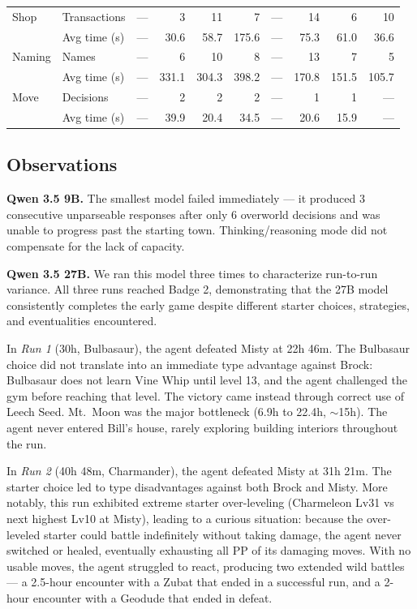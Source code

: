 \documentclass{article}
\begin{document}
\begin{table}[h]
{\begin{tabular}{llrrrrrrrr}
Shop           & Transactions   & --- &    3 &   11 &    7 & --- &   14 &    6 &   10 \\
               & Avg time (s)   & --- & 30.6 & 58.7 & 175.6 & --- & 75.3 & 61.0 & 36.6 \\
Naming         & Names          & --- &    6 &   10 &    8 & --- &   13 &    7 &    5 \\
               & Avg time (s)   & --- & 331.1 & 304.3 & 398.2 & --- & 170.8 & 151.5 & 105.7 \\
Move           & Decisions      & --- &    2 &    2 &    2 & --- &    1 &    1 &  --- \\
               & Avg time (s)   & --- & 39.9 & 20.4 & 34.5 & --- & 20.6 & 15.9 &  --- \\
\bottomrule
\end{tabular}%
}
\end{table}

\subsection{Observations}
\label{sec:obs}

\textbf{Qwen 3.5 9B.} The smallest model failed immediately --- it produced 3 consecutive unparseable responses after only 6 overworld decisions and was unable to progress past the starting town. Thinking/reasoning mode did not compensate for the lack of capacity.

\textbf{Qwen 3.5 27B.} We ran this model three times to characterize run-to-run variance. All three runs reached Badge 2, demonstrating that the 27B model consistently completes the early game despite different starter choices, strategies, and eventualities encountered.

In \emph{Run 1} (30h, Bulbasaur), the agent defeated Misty at 22h 46m. The Bulbasaur choice did not translate into an immediate type advantage against Brock: Bulbasaur does not learn Vine Whip until level 13, and the agent challenged the gym before reaching that level. The victory came instead through correct use of Leech Seed. Mt.\ Moon was the major bottleneck (6.9h to 22.4h, $\sim$15h). The agent never entered Bill's house, rarely exploring building interiors throughout the run.

In \emph{Run 2} (40h 48m, Charmander), the agent defeated Misty at 31h 21m. The starter choice led to type disadvantages against both Brock and Misty. More notably, this run exhibited extreme starter over-leveling (Charmeleon Lv31 vs next highest Lv10 at Misty), leading to a curious situation: because the over-leveled starter could battle indefinitely without taking damage, the agent never switched or healed, eventually exhausting all PP of its damaging moves. With no usable moves, the agent struggled to react, producing two extended wild battles --- a 2.5-hour encounter with a Zubat that ended in a successful run, and a 2-hour encounter with a Geodude that ended in defeat.
\end{document}
